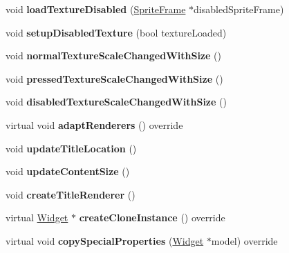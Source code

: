 \begin{DoxyCompactItemize}
\mbox{\label{classui_1_1Button_addbd6cf644b39394524de614bf60e1e7}} 
void {\bfseries load\+Texture\+Disabled} (\hyperlink{classSpriteFrame}{Sprite\+Frame} $\ast$disabled\+Sprite\+Frame)
\item 
\mbox{\label{classui_1_1Button_a4c24e42624cb66addae19fad8ed0e072}} 
void {\bfseries setup\+Disabled\+Texture} (bool texture\+Loaded)
\item 
\mbox{\label{classui_1_1Button_a21cc44949d010f4123d9fdd01fcd6f9d}} 
void {\bfseries normal\+Texture\+Scale\+Changed\+With\+Size} ()
\item 
\mbox{\label{classui_1_1Button_ad44b3e6052b8acc30f16dcd74d8fb221}} 
void {\bfseries pressed\+Texture\+Scale\+Changed\+With\+Size} ()
\item 
\mbox{\label{classui_1_1Button_a1a10c74a3a89e85b12ee465c3fef995a}} 
void {\bfseries disabled\+Texture\+Scale\+Changed\+With\+Size} ()
\item 
\mbox{\label{classui_1_1Button_a840d5a204d5cf2a100572cffef9195ef}} 
virtual void {\bfseries adapt\+Renderers} () override
\item 
\mbox{\label{classui_1_1Button_af3de2e1e480c4525319ad879355374c0}} 
void {\bfseries update\+Title\+Location} ()
\item 
\mbox{\label{classui_1_1Button_aeccd9ca7917693f293fa63dd50dc8627}} 
void {\bfseries update\+Content\+Size} ()
\item 
\mbox{\label{classui_1_1Button_ad83e26a9e7fd702a629a485294903f31}} 
void {\bfseries create\+Title\+Renderer} ()
\item 
\mbox{\label{classui_1_1Button_ace3a0e3ba72d1e203f5b955c354138bf}} 
virtual \hyperlink{classui_1_1Widget}{Widget} $\ast$ {\bfseries create\+Clone\+Instance} () override
\item 
\mbox{\label{classui_1_1Button_af44eeb44d69917363000ca56c5f471c9}} 
virtual void {\bfseries copy\+Special\+Properties} (\hyperlink{classui_1_1Widget}{Widget} $\ast$model) override

\end{DoxyCompactItemize}
